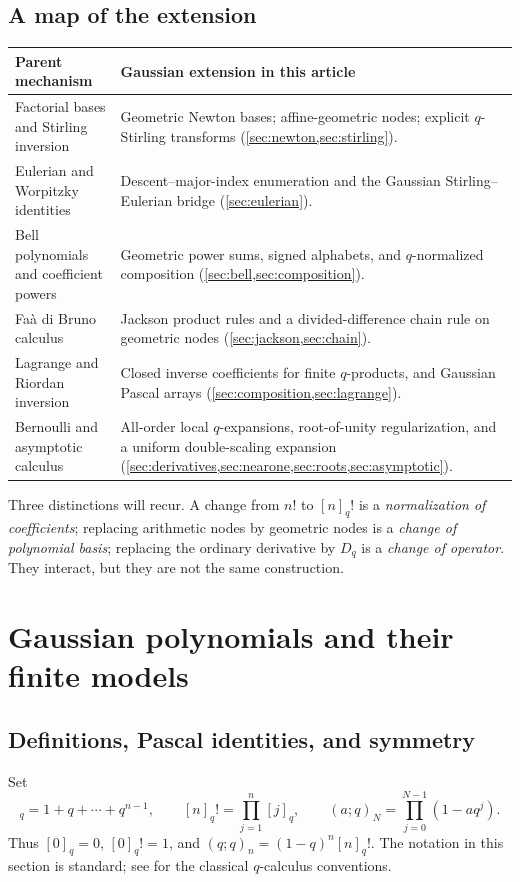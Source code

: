 \documentclass[11pt,a4paper]{article}
\numberwithin{equation}{section}
\theoremstyle{definition}
\theoremstyle{remark}
\newcommand{\qnum}[1]{[#1]_q}
\newcommand{\qfac}[1]{[#1]_q!}
\newcommand{\qp}[2]{(#1;q)_{#2}}
\begin{document}
\subsection{A map of the extension}
\begin{center}
\small
\begin{tabularx}{\textwidth}{@{}p{}X@{}}
\toprule
Parent mechanism & Gaussian extension in this article\\
\midrule
Factorial bases and Stirling inversion & Geometric Newton bases; affine-geometric
nodes; explicit $q$-Stirling transforms (\cref{sec:newton,sec:stirling}).\\
Eulerian and Worpitzky identities & Descent--major-index enumeration and the
Gaussian Stirling--Eulerian bridge (\cref{sec:eulerian}).\\
Bell polynomials and coefficient powers & Geometric power sums, signed alphabets,
and $q$-normalized composition (\cref{sec:bell,sec:composition}).\\
Fa\`a di Bruno calculus & Jackson product rules and a divided-difference chain
rule on geometric nodes (\cref{sec:jackson,sec:chain}).\\
Lagrange and Riordan inversion & Closed inverse coefficients for finite
$q$-products, and Gaussian Pascal arrays (\cref{sec:composition,sec:lagrange}).\\
Bernoulli and asymptotic calculus & All-order local $q$-expansions, root-of-unity
regularization, and a uniform double-scaling expansion
(\cref{sec:derivatives,sec:nearone,sec:roots,sec:asymptotic}).\\
\bottomrule
\end{tabularx}
\end{center}
Three distinctions will recur. A change from $n!$ to $\qfac n$ is a
\emph{normalization of coefficients}; replacing arithmetic nodes by
geometric nodes is a \emph{change of polynomial basis}; replacing the
ordinary derivative by $D_q$ is a \emph{change of operator}. They interact,
but they are not the same construction.

\section{Gaussian polynomials and their finite models}
\label{sec:gaussian}
\subsection{Definitions, Pascal identities, and symmetry}
Set
\begin{equation}
 \qnum n=1+q+\cdots+q^{n-1},\qquad
 \qfac n=\prod_{j=1}^n\qnum j,\qquad
 \qp aN=\prod_{j=0}^{N-1}(1-aq^j).
 \label{eq:qdefs}
\end{equation}
Thus $\qnum0=0$, $\qfac0=1$, and
$\qp qn=(1-q)^n\qfac n$. The notation in this section is standard;
see \cite{dlmf17} for the classical $q$-calculus conventions.
\end{document}

